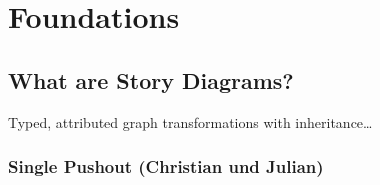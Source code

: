 \chapter{Foundations}


\section{What are Story Diagrams?}

Typed, attributed graph transformations with inheritance\ldots

\subsection{Single Pushout (Christian und Julian)}